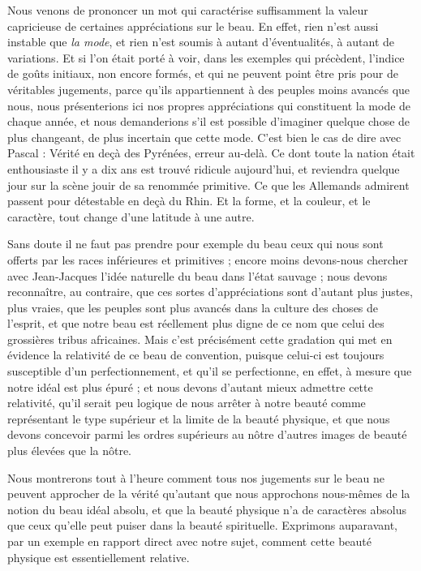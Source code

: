 \documentclass[a4paper, 11pt, oneside, landscape]{article}
\begin{document}
Nous venons de prononcer un mot qui caractérise suffisamment la valeur capricieuse de certaines appréciations sur le beau. En effet, rien n'est aussi instable que \emph{la mode}, et rien n'est soumis à autant d'éventualités, à autant de variations. Et si l'on était porté à voir, dans les exemples qui précèdent, l'indice de goûts initiaux, non encore formés, et qui ne peuvent point être pris pour de véritables jugements, parce qu'ils appartiennent à des peuples moins avancés que nous, nous présenterions ici nos propres appréciations qui constituent la mode de chaque année, et nous demanderions s'il est possible d'imaginer quelque chose de plus changeant, de plus incertain que cette mode. C'est bien le cas de dire avec Pascal : Vérité en deçà des Pyrénées, erreur au-delà. Ce dont toute la nation était enthousiaste il y a dix ans est trouvé ridicule aujourd'hui, et reviendra quelque jour sur la scène jouir de sa renommée primitive. Ce que les Allemands admirent passent pour détestable en deçà du Rhin. Et la forme, et la couleur, et le caractère, tout change d'une latitude à une autre.

Sans doute il ne faut pas prendre pour exemple du beau ceux qui nous sont offerts par les races inférieures et primitives ; encore moins devons-nous chercher avec Jean-Jacques l'idée naturelle du beau dans l'état sauvage ; nous devons reconnaître, au contraire, que ces sortes d'appréciations sont d'autant plus justes, plus vraies, que les peuples sont plus avancés dans la culture des choses de l'esprit, et que notre beau est réellement plus digne de ce nom que celui des grossières tribus africaines. Mais c'est précisément cette gradation qui met en évidence la relativité de ce beau de convention, puisque celui-ci est toujours susceptible d'un perfectionnement, et qu'il se perfectionne, en effet, à mesure que notre idéal est plus épuré ; et nous devons d'autant mieux admettre cette relativité, qu'il serait peu logique de nous arrêter à notre beauté comme représentant le type supérieur et la limite de la beauté physique, et que nous devons concevoir parmi les ordres supérieurs au nôtre d'autres images de beauté plus élevées que la nôtre.

Nous montrerons tout à l'heure comment tous nos jugements sur le beau ne peuvent approcher de la vérité qu'autant que nous approchons nous-mêmes de la notion du beau idéal absolu, et que la beauté physique n'a de caractères absolus que ceux qu'elle peut puiser dans la beauté spirituelle. Exprimons auparavant, par un exemple en rapport direct avec notre sujet, comment cette beauté physique est essentiellement relative.
\end{document}
